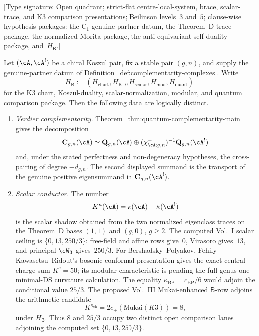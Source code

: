 \begin{proposition}
\label{prop:theorem-C-surface-separation}
\textup{[Type signature: Open quadrant; strict-flat centre-local-system,
brace, scalar-trace, and K3 comparison presentations; Beilinson
levels~\(3\) and~\(5\); clause-wise hypothesis packages: the
\(\mathrm C_1\) genuine-partner datum, the Theorem~D trace package,
the normalized Morita package, the anti-equivariant self-duality
package, and~\(H_{\mathsf B}\).]}

Let $(\cA,\cA^!)$ be a chiral Koszul pair, fix a stable pair
\((g,n)\), and supply the genuine-partner datum of
Definition~\textup{\ref{def:complementarity-complexes}}.
Write
\[
 H_{\mathsf B}:=(H_{\mathrm{chart}},H_{\mathrm{KD}},
 H_{\mathrm{scalar}},H_{\mathrm{mod}},H_{\mathrm{quant}})
\]
for the K3 chart, Koszul-duality, scalar-normalization, modular, and
quantum comparison package.
Then the following data are logically distinct.
\begin{enumerate}[label=\textup{(\roman*)}]
\item \emph{Verdier complementarity.}
 Theorem~\textup{\ref{thm:quantum-complementarity-main}} gives the
 decomposition
 \[
 \mathbf C_{g,n}(\cA)\simeq
 \mathbf Q_{g,n}(\cA)\oplus
 (\chi^-_{\cA;g,n})^{-1}\mathbf Q_{g,n}(\cA^!)
 \]
 and, under the stated perfectness and non-degeneracy hypotheses, the
 cross-pairing of degree \(-d_{g,n}\).  The second displayed summand
 is the transport of the genuine positive eigensummand in
 \(\mathbf C_{g,n}(\cA^!)\).

\item \emph{Scalar conductor.}
 The number
 \[
 K^\kappa(\cA)=\kappa(\cA)+\kappa(\cA^!)
 \]
 is the scalar shadow obtained from the two normalized eigenclass
 traces on the Theorem~D bases \((1,1)\) and \((g,0)\), \(g\geq2\).
 The computed Vol.~I scalar
 ceiling is
 $\{0,13,250/3\}$:
 free-field and affine rows give~$0$, Virasoro gives~$13$,
 and principal $\cW_3$ gives~$250/3$.  For Bershadsky--Polyakov,
 Fehily--Kawasetsu--Ridout's bosonic conformal presentation gives the
 exact central-charge sum $K^c=50$; its modular characteristic is
 \ClaimStatusOpen{} pending the full genus-one minimal-DS curvature
 calculation.  The equality $\kappa_{\mathrm{BP}}=c_{\mathrm{BP}}/6$
 would adjoin the conditional value $25/3$.  The proposed Vol.~III
 Mukai-enhanced $\mathsf B$-row adjoins the
 \ClaimStatusConjectured{} arithmetic candidate
 \[
  K^{\kappa_{\mathrm{ch}}}
  =2c_+(\mathrm{Mukai}(K3))=8,
 \]
 under $H_{\mathsf B}$.  Thus $8$ and $25/3$ occupy two distinct open
 comparison lanes adjoining the computed set $\{0,13,250/3\}$.


\end{enumerate}
\end{proposition}
